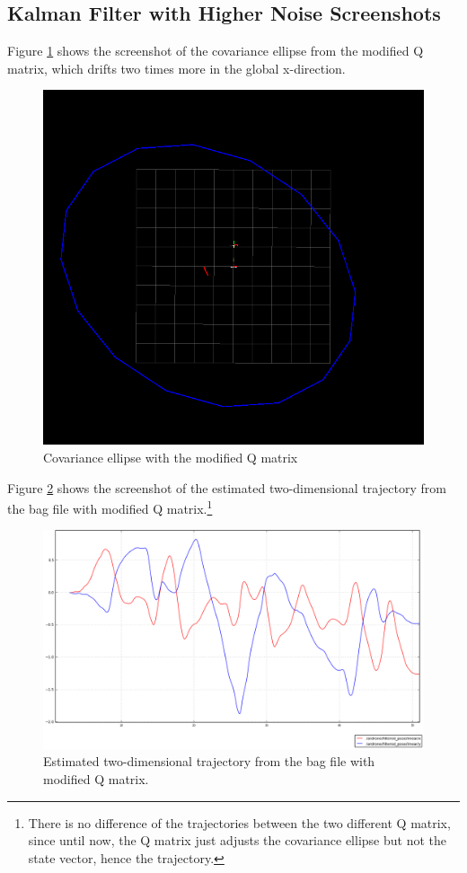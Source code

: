 \documentclass[14pt,a4paper]{article}
\begin{document}
	\subsection{Kalman Filter with Higher Noise Screenshots}
	Figure \ref{graph:Q_2Times} shows the screenshot of the covariance ellipse from the modified Q matrix, which drifts two times more in the global x-direction.\\
	
	\begin{figure}[htbp]
	\includegraphics[scale=0.5]{Q_x_2Times.png}
  	\caption{Covariance ellipse with the modified Q matrix}
    \label{graph:Q_2Times}
	\end{figure}
	
		Figure \ref{graph:filtered_pose_modifiedQ} shows the screenshot of the estimated two-dimensional trajectory from the bag file with modified Q matrix.\footnote{There is no difference of the trajectories between the two different Q matrix, since until now, the Q matrix just adjusts the covariance ellipse but not the state vector, hence the trajectory.}
	
	\begin{figure}[htbp]
	\centering
	\includegraphics[scale=0.4]{filtered_pose_modifiedQ.png}
  	\caption{Estimated two-dimensional trajectory from the bag file with modified Q matrix.}
    \label{graph:filtered_pose_modifiedQ}
	\end{figure}
	
\end{document}
